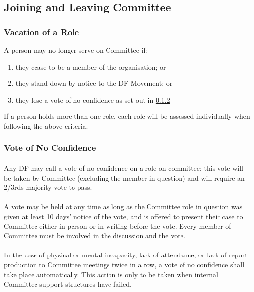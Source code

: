 \documentclass[a4paper, 11pt]{report}
\begin{document}
\subsection{Joining and Leaving Committee}
\label{sec:joiningleaving}

\subsubsection{Vacation of a Role}
A person may no longer serve on Committee if:
\begin{enumerate}[\hspace{0.5cm}(a)]
\item they cease to be a member of the organisation; or
\item they stand down by notice to the DF Movement; or
\item they lose a vote of no confidence as set out in \ref{sec:noconfidence}
\end{enumerate}

If a person holds more than one role, each role will be assessed individually when following the above criteria.

\subsubsection{Vote of No Confidence}
\label{sec:noconfidence}
\paragraph{} Any DF may call a vote of no confidence on a role on committee; this vote will be taken by Committee (excluding the member in question) and will require an 2/3rds majority vote to pass.
\paragraph{} A vote may be held at any time as long as the Committee role in question was given at least 10 days’ notice of the vote, and is offered to present their case to Committee either in person or in writing before the vote. Every member of Committee must be involved in the discussion and the vote.
\paragraph{} In the case of physical or mental incapacity, lack of attendance, or lack of report production to Committee meetings twice in a row, a vote of no confidence shall take place automatically. This action is only to be taken when internal Committee support structures have failed.
\end{document}
